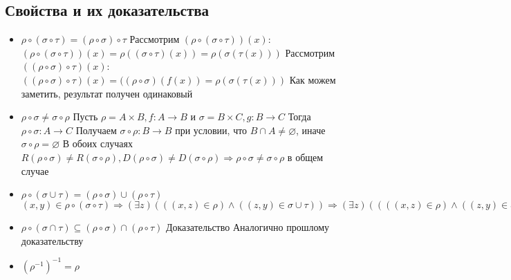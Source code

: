 \documentclass{report}
\begin{document}
\subsection{Свойства и их доказательства}
\begin{itemize}
    \item $\rho \circ (\sigma \circ \tau) = (\rho \circ \sigma) \circ \tau$\newline
          Рассмотрим $(\rho \circ (\sigma \circ \tau))(x)$: $(\rho \circ (\sigma \circ \tau))(x) = \rho((\sigma \circ \tau)(x)) = \rho(\sigma(\tau(x)))$\newline
          Рассмотрим $((\rho \circ \sigma) \circ \tau)(x)$: $((\rho \circ \sigma) \circ \tau)(x) = ((\rho \circ \sigma)(f(x)) = \rho(\sigma(\tau(x)))$\newline
          Как можем заметить, результат получен одинаковый
    \item $\rho \circ \sigma \neq \sigma \circ \rho$\newline
          Пусть $\rho = A \times B, f: A \rightarrow B$ и $\sigma = B \times C, g: B \rightarrow C$\newline
          Тогда $\rho \circ \sigma: A \rightarrow C$\newline
          Получаем $\sigma \circ \rho: B \rightarrow B$ при условии, что $B \cap A \neq \varnothing$, иначе $\sigma \circ \rho = \varnothing$\newline
          В обоих случаях $R(\rho \circ \sigma) \neq R(\sigma \circ \rho),
              D(\rho \circ \sigma) \neq D(\sigma \circ \rho) \Rightarrow
              \rho \circ \sigma \neq \sigma \circ \rho$ в общем случае
    \item $\rho \circ (\sigma \cup \tau) = (\rho \circ \sigma) \cup (\rho \circ \tau)$\newline
          $(x,y) \in \rho \circ (\sigma \circ \tau) \Rightarrow
              (\exists z)(((x,z) \in \rho) \land ((z,y) \in \sigma \cup \tau)) \Rightarrow
              (\exists z)((((x,z) \in \rho) \land ((z,y) \in \sigma) \lor ((z,y) \in \tau))) \Rightarrow
              (\exists u)(((x,u) \in \rho) \land ((u,y) \in \sigma) \lor (\exists v)((x,v) \in \rho \land (v,y) \in \tau)) \Rightarrow
              (\rho \circ \sigma) \cup \rho \circ \tau$
    \item  $\rho \circ (\sigma \cap \tau) \subseteq (\rho \circ \sigma) \cap (\rho \circ \tau)$\newline
          Доказательство Аналогично прошлому доказательству
    \item $(\rho^{-1})^{-1} = \rho$\newline

\end{itemize}
\end{document}

